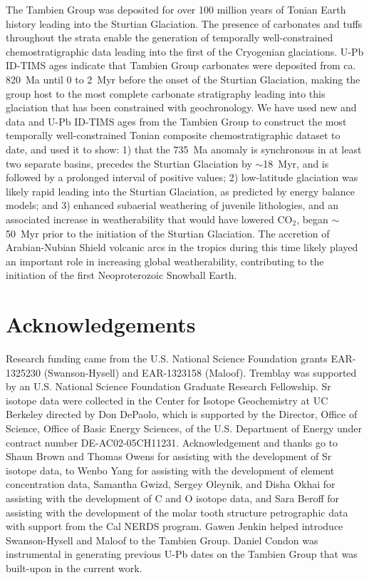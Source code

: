 The Tambien Group was deposited for over 100 million years of Tonian Earth history leading into the Sturtian Glaciation. The presence of carbonates and tuffs throughout the strata enable the generation of temporally well-constrained chemostratigraphic data leading into the first of the Cryogenian glaciations. U-Pb ID-TIMS ages indicate that Tambien Group carbonates were deposited from ca. 820~Ma until 0 to 2~Myr before the onset of the Sturtian Glaciation, making the group host to the most complete carbonate stratigraphy leading into this glaciation that has been constrained with geochronology. We have used new \dC and \SrSr data and U-Pb ID-TIMS ages from the Tambien Group to construct the most temporally well-constrained Tonian composite chemostratigraphic dataset to date, and used it to show: 1) that the 735~Ma anomaly is synchronous in at least two separate basins, precedes the Sturtian Glaciation by $\sim$18~Myr, and is followed by a prolonged interval of positive \dC values; 2) low-latitude glaciation was likely rapid leading into the Sturtian Glaciation, as predicted by energy balance models; and 3) enhanced subaerial weathering of juvenile lithologies, and an associated increase in weatherability that would have lowered CO$_{2}$, began $\sim$50~Myr prior to the initiation of the Sturtian Glaciation. The accretion of Arabian-Nubian Shield volcanic arcs in the tropics during this time likely played an important role in increasing global weatherability, contributing to the initiation of the first Neoproterozoic Snowball Earth.

\section{Acknowledgements}

Research funding came from the U.S. National Science Foundation grants EAR-1325230 (Swanson-Hysell) and EAR-1323158 (Maloof). Tremblay was supported by an U.S. National Science Foundation Graduate Research Fellowship. Sr isotope data were collected in the Center for Isotope Geochemistry at UC Berkeley directed by Don DePaolo, which is supported by the Director, Office of Science, Office of Basic Energy Sciences, of the U.S. Department of Energy under contract number DE-AC02-05CH11231. Acknowledgement and thanks go to Shaun Brown and Thomas Owens for assisting with the development of Sr isotope data, to Wenbo Yang for assisting with the development of element concentration data, Samantha Gwizd, Sergey Oleynik, and Disha Okhai for assisting with the development of C and O isotope data, and Sara Beroff for assisting with the development of the molar tooth structure petrographic data with support from the Cal NERDS program. Gawen Jenkin helped introduce Swanson-Hysell and Maloof to the Tambien Group. Daniel Condon was instrumental in generating previous U-Pb dates on the Tambien Group that was built-upon in the current work.